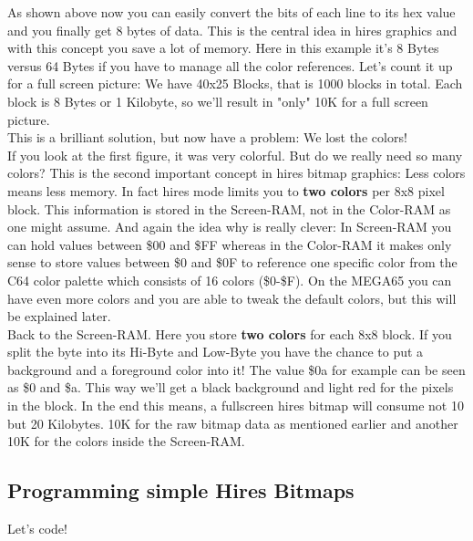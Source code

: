 \setlength{}

As shown above now you can easily convert the bits of each line to its hex value and you finally get 8 bytes of data. This is the central idea in hires graphics and with this concept you save a lot of memory. Here in this example it's 8 Bytes versus 64 Bytes if you have to manage all the color references.
Let's count it up for a full screen picture: We have 40x25 Blocks, that is 1000 blocks in total. Each block is 8 Bytes or 1 Kilobyte, so we'll result in "only" 10K for a full screen picture.\\

This is a brilliant solution, but now have a problem: We lost the colors!\\

If you look at the first figure, it was very colorful. But do we really need so many colors? This is the second important concept in hires bitmap graphics: Less colors means less memory. In fact hires mode limits you to \textbf{two colors} per 8x8 pixel block. This information is stored in the Screen-RAM, not in the Color-RAM as one might assume. And again the idea why is really clever: In Screen-RAM you can hold values between \$00 and \$FF whereas in the Color-RAM it makes only sense to store values between \$0 and \$0F to reference one specific color from the C64 color palette which consists of 16 colors (\$0-\$F). On the MEGA65 you can have even more colors and you are able to tweak the default colors, but this will be explained later.\\

Back to the Screen-RAM. Here you store \textbf{two colors} for each 8x8 block. If you split the byte into its Hi-Byte and Low-Byte you have the chance to put a background and a foreground color into it! The value \$0a for example can be seen as \$0 and \$a. This way we'll get a black background and light red for the pixels in the block. In the end this means, a fullscreen hires bitmap will consume not 10 but 20 Kilobytes. 10K for the raw bitmap data as mentioned earlier and another 10K for the colors inside the Screen-RAM.\\


\subsection*{Programming simple Hires Bitmaps}

Let's code!

